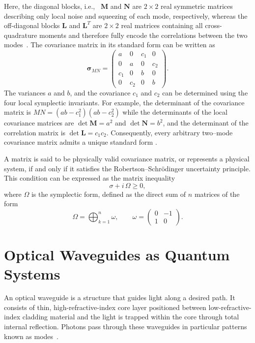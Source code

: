Here, the diagonal blocks, i.e., \ $\mathbf{M}$ and $\mathbf{N}$ are $2\times2$ real symmetric
matrices describing only local noise and squeezing of each mode, respectively, whereas the
off-diagonal blocks $\mathbf{L}$ and $\mathbf{L}^{T}$ are $2\times2$ real matrices
containing all cross-quadrature moments and therefore fully encode the correlations
between the two modes~\cite{AdessoRagyLee2014}.
The covariance matrix in its standard form can be written as
\begin{equation}
	\boldsymbol{\sigma}_{MN} =
	\begin{pmatrix}
		a & 0 & c_1 & 0 \\
		0 & a & 0 & c_2 \\
		c_1 & 0 & b & 0 \\
		0 & c_2 & 0 & b
	\end{pmatrix}.
	\label{eq:CM_standard_form}
\end{equation}
The variances $a$ and $b$, and the covariance $c_{1}$ and $c_{2}$ can be determined using
the four local symplectic invariants. For example, the determinant of the covariance
matrix is $MN = (ab - c_{1}^{2})(ab - c_{2}^{2})$
 while
the determinants of the local covariance matrices are $\det \mathbf{M} = a^{2}$ and
$\det \mathbf{N} = b^{2}$, and the determinant of the correlation matrix is
$\det \mathbf{L} = c_{1}c_{2}$. Consequently, every arbitrary two--mode covariance
matrix admits a unique standard form
\cite{BraunsteinVanLoock2005,Weedbrook2012,AdessoRagyLee2014}.


A matrix is said to be physically valid covariance matrix, or represents a physical system, if and only
if it satisfies the Robertson--Schr\"odinger uncertainty principle. This condition can be
expressed as the matrix inequality~\cite{AdessoRagyLee2014,Weedbrook2012}
\begin{equation}
	\sigma + i\,\Omega \geq 0 ,
\end{equation}
where $\Omega$ is the symplectic form, defined as the direct sum of $n$ matrices of the
form~\cite{AdessoRagyLee2014,Weedbrook2012}
\begin{equation}
	\Omega = \bigoplus_{k=1}^{n} \omega,
	\qquad
	\omega =
	\begin{pmatrix}
		0 & -1 \\
		1 & 0
	\end{pmatrix}.
\end{equation}


\section{Optical Waveguides as Quantum Systems}
An optical waveguide is a structure that guides light along a desired path. It consists of thin, high-refractive-index core layer positioned between low-refractive-index cladding material and the light is trapped within the core through total internal reflection\cite{Ihn2020}. Photons pass through these waveguides in particular patterns known as modes~\cite{Fu2002}.

